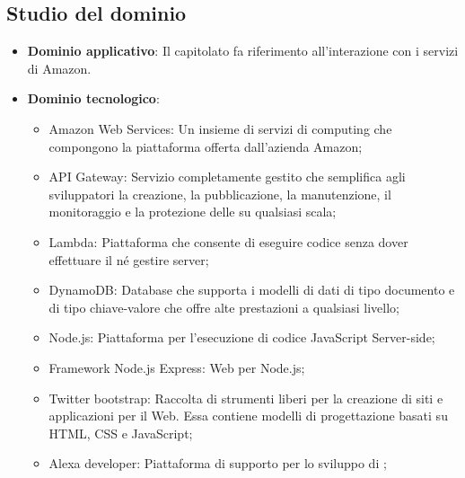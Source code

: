 \subsection{Studio del dominio}
     \begin{itemize}
        \item \textbf{Dominio applicativo}: Il capitolato fa riferimento all'interazione con i servizi di Amazon.
        \item \textbf{Dominio tecnologico}: 
            \begin{itemize}
                \item Amazon Web Services: Un insieme di servizi di  computing che compongono la piattaforma  offerta dall'azienda Amazon;
                \item API Gateway: Servizio completamente gestito che semplifica agli sviluppatori la creazione, la pubblicazione, la manutenzione, il monitoraggio e la protezione
		        delle  su qualsiasi scala;
                \item Lambda: Piattaforma che consente di eseguire codice senza dover effettuare il  né gestire server;
                \item DynamoDB: Database che supporta i modelli di dati di tipo documento e di tipo chiave-valore che offre alte prestazioni a qualsiasi livello;
                \item Node.js: Piattaforma   per l'esecuzione di codice JavaScript Server-side;
                \item Framework Node.js Express: Web  per Node.js;
                \item Twitter bootstrap: Raccolta di strumenti liberi per la creazione di siti e applicazioni per il Web. Essa contiene modelli di progettazione basati su HTML, CSS
		        e JavaScript;
		        \item Alexa developer: Piattaforma di supporto per lo sviluppo di ;
        \end{itemize}
    \end{itemize}
